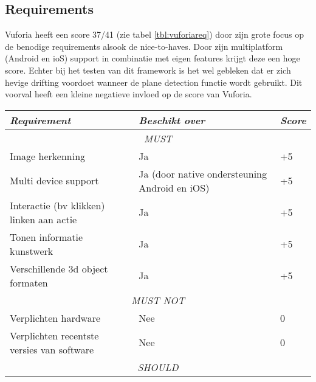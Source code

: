 \subsection{Requirements}
Vuforia heeft een score 37/41 (zie tabel \ref{tbl:vuforiareq}) door zijn grote focus op de benodige requirements alsook de nice-to-haves. Door zijn multiplatform (Android en ioS) support in combinatie met eigen features krijgt deze een hoge score. Echter bij het testen van dit framework is het wel gebleken dat er zich hevige drifting voordoet wanneer de plane detection functie wordt gebruikt. Dit voorval heeft een kleine negatieve invloed op de score van Vuforia.
\begin{table}[]
    \centering
    \begin{tabular}{@{}lll@{}}
        \toprule
        \textit{Requirement}                       & \textit{Beschikt over}                        & \textit{Score} \\ \midrule
        \multicolumn{3}{c}{\textit{MUST}}                                                                           \\ \midrule
        Image herkenning                           & Ja                                            & +5             \\
        Multi device support                       & Ja (door native ondersteuning Android en iOS) & +5             \\
        Interactie (bv klikken) linken aan actie   & Ja                                            & +5             \\
        Tonen informatie kunstwerk                 & Ja                                            & +5             \\
        Verschillende 3d object formaten           & Ja                                            & +5             \\ \midrule
        \multicolumn{3}{c}{\textit{MUST NOT}}                                                                       \\ \midrule
        Verplichten hardware                       & Nee                                           & 0              \\
        Verplichten recentste versies van software & Nee                                           & 0              \\ \midrule
        \multicolumn{3}{c}{\textit{SHOULD}}                                                                         \\ \midrule

\end{tabular}
\end{table}
